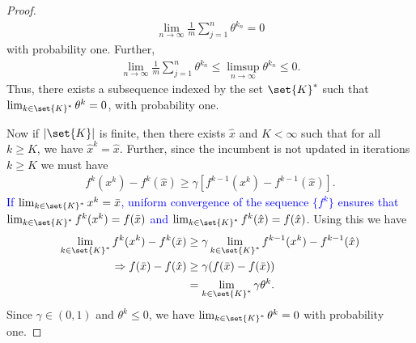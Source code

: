 \documentclass[11pt]{article}
\begin{document}
\begin{proof}
\begin{align*}
    \lim_{n \rightarrow \infty} \frac{1}{m} \sum_{j = 1}^n \theta^{k_n} = 0
\end{align*}
with probability one. Further,
\begin{align*}
    \lim_{n \rightarrow \infty} \frac{1}{m} \sum_{j = 1}^n \theta^{k_n} \leq \limsup_{n \rightarrow \infty} \theta^{k_n} \leq 0.
\end{align*}
Thus, there exists a subsequence indexed by the set $\set{K}^*$ such that $\lim_{k \in \set{K}^*} \theta^k = 0$, with probability one.  

Now if $|\set{K}|$ is finite, then there exists $\hat{x}$ and $K < \infty$ such that for all $k \geq K$, we have $\hat{x}^k = \hat{x}$. Further, since the incumbent is not updated in iterations $k \geq K$ we must have 
\begin{align*}
	f^{k}(x^k) - f^{k}(\hat{x}) \geq \gamma [f^{k-1}(x^k) - f^{k-1}(\hat{x})].
\end{align*}
\textcolor{blue}{If $\lim_{k \in \set{K}^*} x^k = \bar{x}$, uniform convergence of the sequence $\{f^k\}$ ensures that $\lim_{k \in \set{K}^*} f^k(x^k) = f(\bar{x})$ and $\lim_{k \in \set{K}^*} f^k(\hat{x}) = f(\hat{x})$}. Using this we have
\begin{align*}
	\lim_{k \in \set{K}^*} f^{k}(x^k) - f^{k}(\bar{x}) &\geq \gamma \lim_{k \in \set{K}^*} f^{k-1}(x^k) - f^{k-1}(\hat{x}) \\
	\Rightarrow f(\bar{x}) - f(\hat{x}) &\geq \gamma(f(\bar{x}) - f(\bar{x})) \\
	&= \lim_{k \in \set{K}^*} \gamma\theta^k.
\end{align*}
Since $\gamma \in (0,1)$ and $\theta^k \leq 0$, we have $\lim_{k \in \set{K}^*} \theta^k = 0$ with probability one.
\end{proof}
\end{document}
